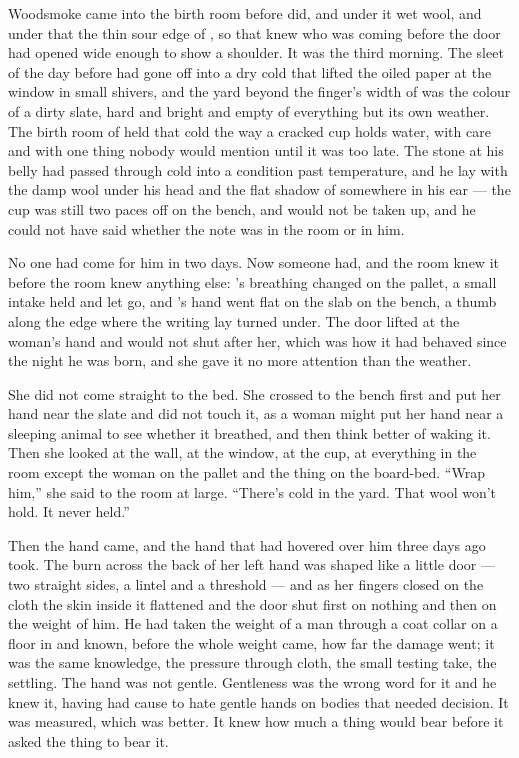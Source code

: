 
Woodsmoke came into the birth room before  did, and under it wet wool, and under that the thin sour edge of , so that  knew who was coming before the door had opened wide enough to show a shoulder. It was the third morning. The sleet of the day before had gone off into a dry cold that lifted the oiled paper at the window in small shivers, and the yard beyond the finger's width of  was the colour of a dirty slate, hard and bright and empty of everything but its own weather. The birth room of  held that cold the way a cracked cup holds water, with care and with one thing nobody would mention until it was too late. The stone at his belly had passed through cold into a condition past temperature, and he lay with the damp wool under his head and the flat shadow of  somewhere in his ear --- the cup was still two paces off on the bench, and would not be taken up, and he could not have said whether the note was in the room or in him.

No one had come for him in two days. Now someone had, and the room knew it before the room knew anything else: 's breathing changed on the pallet, a small intake held and let go, and 's hand went flat on the slab on the bench, a thumb along the edge where the writing lay turned under. The door lifted at the woman's hand and would not shut after her, which was how it had behaved since the night he was born, and she gave it no more attention than the weather.

She did not come straight to the bed. She crossed to the bench first and put her hand near the slate and did not touch it, as a woman might put her hand near a sleeping animal to see whether it breathed, and then think better of waking it. Then she looked at the wall, at the window, at the cup, at everything in the room except the woman on the pallet and the thing on the board-bed. “Wrap him,” she said to the room at large. “There's cold in the yard. That wool won't hold. It never held.”

Then the hand came, and the hand that had hovered over him three days ago took. The burn across the back of her left hand was shaped like a little door --- two straight sides, a lintel and a threshold --- and as her fingers closed on the cloth the skin inside it flattened and the door shut first on nothing and then on the weight of him. He had taken the weight of a man through a coat collar on a floor in  and known, before the whole weight came, how far the damage went; it was the same knowledge, the pressure through cloth, the small testing take, the settling. The hand was not gentle. Gentleness was the wrong word for it and he knew it, having had cause to hate gentle hands on bodies that needed decision. It was measured, which was better. It knew how much a thing would bear before it asked the thing to bear it.

